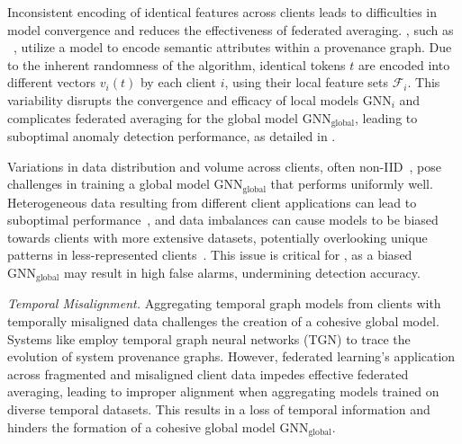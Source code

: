 \begin{enumerate}[itemsep=0.1em, parsep=0em, topsep=0em, leftmargin=*]

   Inconsistent encoding of identical features across clients leads to difficulties in model convergence and reduces the effectiveness of federated averaging. \pids, such as \flash~\cite{cheng2023kairos}, utilize a \wordvec model to encode semantic attributes within a provenance graph. Due to the inherent randomness of the \wordvec algorithm, identical tokens \( t \) are encoded into different vectors \( v_i(t) \) by each client \( i \), using their local feature sets \( \mathcal{F}_i \). This variability disrupts the convergence and efficacy of local \gnn models \( \text{GNN}_{i} \) and complicates federated averaging for the global \gnn model \( \text{GNN}_{\text{global}} \), leading to suboptimal anomaly detection performance, as detailed in \cite{zhou2023fedfa}.

   Variations in data distribution and volume across clients, often non-IID~\cite{zhao2018federated}, pose challenges in training a global model \( \text{GNN}_{\text{global}} \) that performs uniformly well. Heterogeneous data resulting from different client applications can lead to suboptimal performance~\cite{qu2022rethinking}, and data imbalances can cause models to be biased towards clients with more extensive datasets, potentially overlooking unique patterns in less-represented clients~\cite{duan2020self}. This issue is critical for \pids, as a biased \( \text{GNN}_{\text{global}} \) may result in high false alarms, undermining detection accuracy.


   {\it Temporal Misalignment.} Aggregating temporal graph models from clients with temporally misaligned data challenges the creation of a cohesive global model. Systems like \kairos \cite{cheng2023kairos} employ temporal graph neural networks (TGN) to trace the evolution of system provenance graphs. However, federated learning's application across fragmented and misaligned client data impedes effective federated averaging, leading to improper alignment when aggregating models trained on diverse temporal datasets. This results in a loss of temporal information and hinders the formation of a cohesive global model \( \text{GNN}_{\text{global}} \).
  
\end{enumerate}



